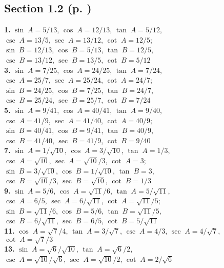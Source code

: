 \begin{multicols}{2}
\subsection*{Section 1.2 (p. \pageref{sec1dot2})}
\textbf{1.} $\sin\;A = 5/13$, $\cos\;A = 12/13$, $\tan\;A = 5/12$,\\
$\csc\;A = 13/5$, $\sec\;A = 13/12$, $\cot\;A = 12/5$;\\
$\sin\;B = 12/13$, $\cos\;B = 5/13$, $\tan\;B = 12/5$,\\
$\csc\;B = 13/12$, $\sec\;B = 13/5$, $\cot\;B = 5/12$\\
\textbf{3.} $\sin\;A = 7/25$, $\cos\;A = 24/25$, $\tan\;A = 7/24$,\\
$\csc\;A = 25/7$, $\sec\;A = 25/24$, $\cot\;A = 24/7$;\\
$\sin\;B = 24/25$, $\cos\;B = 7/25$, $\tan\;B = 24/7$,\\
$\csc\;B = 25/24$, $\sec\;B = 25/7$, $\cot\;B = 7/24$\\
\textbf{5.} $\sin\;A = 9/41$, $\cos\;A = 40/41$, $\tan\;A = 9/40$,\\
$\csc\;A = 41/9$, $\sec\;A = 41/40$, $\cot\;A = 40/9$;\\
$\sin\;B = 40/41$, $\cos\;B = 9/41$, $\tan\;B = 40/9$,\\
$\csc\;B = 41/40$, $\sec\;B = 41/9$, $\cot\;B = 9/40$\\
\textbf{7.} $\sin\;A = 1/\sqrt{10}$, $\cos\;A = 3/\sqrt{10}$, $\tan\;A = 1/3$,\\
$\csc\;A = \sqrt{10}$, $\sec\;A = \sqrt{10}/3$, $\cot\;A = 3$;\\
$\sin\;B = 3/\sqrt{10}$, $\cos\;B = 1/\sqrt{10}$, $\tan\;B = 3$,\\
$\csc\;B = \sqrt{10}/3$, $\sec\;B = \sqrt{10}$, $\cot\;B = 1/3$\\
\textbf{9.} $\sin\;A = 5/6$, $\cos\;A = \sqrt{11}/6$, $\tan\;A = 5/\sqrt{11}$,\\
$\csc\;A = 6/5$, $\sec\;A = 6/\sqrt{11}$, $\cot\;A = \sqrt{11}/5$;\\
$\sin\;B = \sqrt{11}/6$, $\cos\;B = 5/6$, $\tan\;B = \sqrt{11}/5$,\\
$\csc\;B = 6/\sqrt{11}$, $\sec\;B = 6/5$, $\cot\;B = 5/\sqrt{11}$\\
\textbf{11.} $\cos\;A = \sqrt{7}/4$, $\tan\;A = 3/\sqrt{7}$,
$\csc\;A = 4/3$, $\sec\;A = 4/\sqrt{7}$, $\cot\;A = \sqrt{7}/3$\\
\textbf{13.} $\sin\;A = \sqrt{6}/\sqrt{10}$, $\tan\;A = \sqrt{6}/2$,\\
$\csc\;A = \sqrt{10}/\sqrt{6}$, $\sec\;A = \sqrt{10}/2$, $\cot\;A = 2/\sqrt{6}$\\

\end{multicols}
